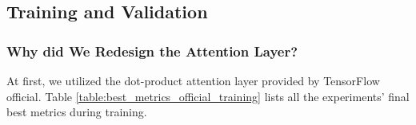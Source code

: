 \documentclass[
twocolumn,
]{ceurart}
\begin{document}

\subsection{Training and Validation} %

\subsubsection{Why did We Redesign the Attention Layer?}

At first, we utilized the dot-product attention layer provided by TensorFlow official. Table \ref{table:best_metrics_official_training} lists all the experiments' final best metrics during training.
\end{document}
